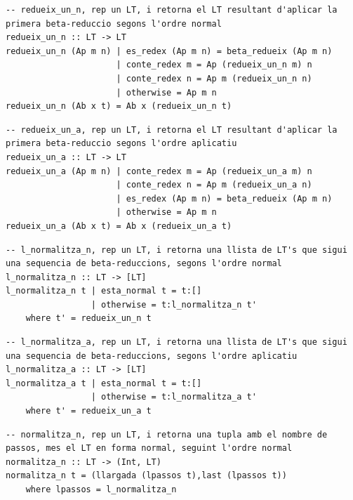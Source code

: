 \documentclass[10pt,a4paper]{article}
\begin{document}
\lstset{language=Haskell, breaklines=true, basicstyle=\footnotesize}
\begin{lstlisting}[frame=mystyle]
-- redueix_un_n, rep un LT, i retorna el LT resultant d'aplicar la primera beta-reduccio segons l'ordre normal
redueix_un_n :: LT -> LT
redueix_un_n (Ap m n) | es_redex (Ap m n) = beta_redueix (Ap m n)
                      | conte_redex m = Ap (redueix_un_n m) n
                      | conte_redex n = Ap m (redueix_un_n n)
                      | otherwise = Ap m n
redueix_un_n (Ab x t) = Ab x (redueix_un_n t)
\end{lstlisting}



\lstset{language=Haskell, breaklines=true, basicstyle=\footnotesize}
\begin{lstlisting}[frame=mystyle]
-- redueix_un_a, rep un LT, i retorna el LT resultant d'aplicar la primera beta-reduccio segons l'ordre aplicatiu
redueix_un_a :: LT -> LT
redueix_un_a (Ap m n) | conte_redex m = Ap (redueix_un_a m) n
                      | conte_redex n = Ap m (redueix_un_a n)
                      | es_redex (Ap m n) = beta_redueix (Ap m n)
                      | otherwise = Ap m n
redueix_un_a (Ab x t) = Ab x (redueix_un_a t)
\end{lstlisting}



\lstset{language=Haskell, breaklines=true, basicstyle=\footnotesize}
\begin{lstlisting}[frame=mystyle]
-- l_normalitza_n, rep un LT, i retorna una llista de LT's que sigui una sequencia de beta-reduccions, segons l'ordre normal
l_normalitza_n :: LT -> [LT]
l_normalitza_n t | esta_normal t = t:[]
                 | otherwise = t:l_normalitza_n t'
    where t' = redueix_un_n t
\end{lstlisting}



\lstset{language=Haskell, breaklines=true, basicstyle=\footnotesize}
\begin{lstlisting}[frame=mystyle]
-- l_normalitza_a, rep un LT, i retorna una llista de LT's que sigui una sequencia de beta-reduccions, segons l'ordre aplicatiu
l_normalitza_a :: LT -> [LT]
l_normalitza_a t | esta_normal t = t:[]
                 | otherwise = t:l_normalitza_a t'
    where t' = redueix_un_a t
\end{lstlisting}



\lstset{language=Haskell, breaklines=true, basicstyle=\footnotesize}
\begin{lstlisting}[frame=mystyle]
-- normalitza_n, rep un LT, i retorna una tupla amb el nombre de passos, mes el LT en forma normal, seguint l'ordre normal
normalitza_n :: LT -> (Int, LT)
normalitza_n t = (llargada (lpassos t),last (lpassos t))
    where lpassos = l_normalitza_n
\end{lstlisting}
\end{document}
